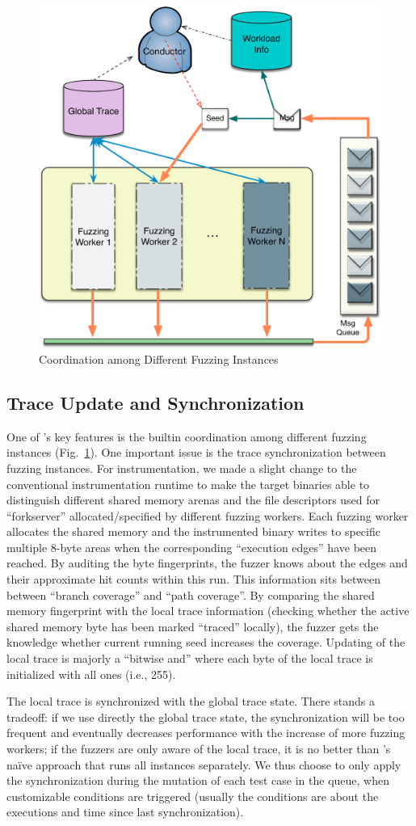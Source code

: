 \begin{figure}[t]
	\centering
	\includegraphics[width=0.6\columnwidth]{res/fot/mt_workflow}
	\caption{Coordination among Different Fuzzing Instances}
	\label{fig:mt_workflow}
\end{figure}


\subsection{Trace Update and Synchronization}\label{sec:trace_sync}
One of {\FOT}'s key features is the builtin coordination among different fuzzing instances (Fig.~\ref{fig:mt_workflow}). One important issue is the trace synchronization between fuzzing instances. For instrumentation, we made a slight change to the conventional instrumentation runtime to make the target binaries able to distinguish different shared memory arenas and the file descriptors used for ``forkserver'' allocated/specified by different fuzzing workers. Each fuzzing worker allocates the shared memory and the instrumented binary writes to specific multiple 8-byte areas when the corresponding ``execution edges'' have been reached. By auditing the byte fingerprints, the fuzzer knows about the edges and their approximate hit counts within this run. This information sits between between ``branch coverage'' and ``path coverage''. By comparing the shared memory fingerprint with the local trace information (checking whether the active shared memory byte has been marked ``traced'' locally), the fuzzer gets the knowledge whether current running seed increases the coverage. Updating of the local trace is majorly a ``bitwise and'' where each byte of the local trace is initialized with all ones (i.e., 255).

The local trace is synchronized with the global trace state. There stands a tradeoff: if we use directly the global trace state, the synchronization will be too frequent and eventually decreases performance with the increase of more fuzzing workers; if the fuzzers are only aware of the local trace, it is no better than {\AFL}'s na\"ive approach that runs all instances separately. We thus choose to only apply the synchronization during the mutation of each test case in the queue, when customizable conditions are triggered (usually the conditions are about the executions and time since last synchronization).

